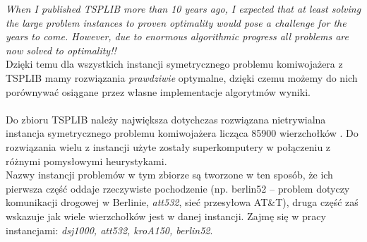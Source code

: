 \documentclass[a4paper]{article}
\theoremstyle{defn}
\theoremstyle{theorem}
\theoremstyle{lemma}
\theoremstyle{cor}
\theoremstyle{fact}
\begin{document}
\textit{When I published TSPLIB more than 10 years ago, I expected that at least solving the large problem instances to proven optimality would pose a challenge for the years to come.
However, due to enormous algorithmic progress all problems are now solved to optimality!!}
\\
Dzięki temu dla wszystkich instancji symetrycznego problemu komiwojażera z TSPLIB mamy rozwiązania \textit{prawdziwie} optymalne, dzięki czemu możemy do nich porównywać osiągane przez własne implementacje algorytmów wyniki.\\\\
Do zbioru TSPLIB należy największa dotychczas rozwiązana nietrywialna instancja symetrycznego problemu komiwojażera licząca 85900 wierzchołków \cite{85900}. Do rozwiązania wielu z instancji użyte zostały superkomputery w połączeniu z różnymi pomysłowymi heurystykami.\\

Nazwy instancji problemów w tym zbiorze są tworzone w ten sposób, że ich pierwsza część oddaje rzeczywiste pochodzenie (np. berlin52 – problem dotyczy komunikacji drogowej w Berlinie, \textit{att532}, sieć przesyłowa AT\&T), druga część zaś wskazuje jak wiele wierzchołków jest w danej instancji. Zajmę się w pracy instancjami: \textit{dsj1000, att532, kroA150, berlin52}.
\end{document}

